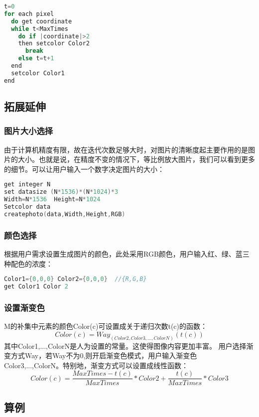 \documentclass{ctexart}
\begin{document}
\lstset{
    numbers=left, numberstyle=\it, stepnumber=2, numbersep=5pt,
}
\begin{lstlisting}[language=C]
t=0
for each pixel
  do get coordinate
  while t<MaxTimes
    do if |coordinate|>2
    then setcolor Color2
      break
    else t=t+1
  end
  setcolor Color1
end
\end{lstlisting}

\subsection{拓展延伸}

\subsubsection{图片大小选择}

由于计算机精度有限，故在迭代次数足够大时，对图片的清晰度起主要作用的是图片的大小。也就是说，在精度不变的情况下，等比例放大图片，我们可以看到更多的细节。可以让用户输入一个数字决定图片的大小：

\begin{lstlisting}[language=C]
get integer N
set datasize (N*1536)*(N*1024)*3
Width=N*1536  Height=N*1024
Setcolor data
createphoto(data,Width,Height,RGB)
\end{lstlisting}

\subsubsection{颜色选择}

根据用户需求设置生成图片的颜色，此处采用RGB颜色，用户输入红、绿、蓝三种配色的浓度：

\begin{lstlisting}[language=C]
Color1={0,0,0} Color2={0,0,0}  //{R,G,B}
get Color1 Color 2
\end{lstlisting}

\subsubsection{设置渐变色}
M的补集中元素的颜色Color(c)可设置成关于递归次数t(c)的函数：$$Color(c)=Way_{(Color2,Color3,...,ColorN)}(t(c))$$其中Color1,...,ColorN是人为设置的常量。这使得图像内容更加丰富。
用户选择渐变方式Way，若Way不为0,则开启渐变色模式，用户输入渐变色Color3,...,ColorN。特别地，渐变方式可以设置成线性函数：
$$Color(c)=\frac{MaxTimes-t(c)}{MaxTimes}*Color2+\frac{t(c)}{MaxTimes}*Color3$$

\subsection{算例}
\end{document}
